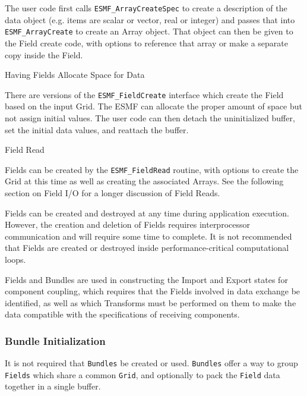\begin{description}
The user code first calls 
{\tt ESMF\_ArrayCreateSpec} to create a
description of the data object (e.g. items are scalar or vector,
real or integer) and passes that into {\tt ESMF\_ArrayCreate}
to create an Array object.  That object can then be given
to the Field create code, with options to reference that array
or make a separate copy inside the Field. 

\item{Having Fields Allocate Space for Data}

There are versions of the {\tt ESMF\_FieldCreate} interface
which create the Field based on the input Grid.  The ESMF
can allocate the proper amount of 
space but not assign initial values.  The user code
can then detach the uninitialized buffer, set the
initial data values, and reattach the buffer.

\item{Field Read}

Fields can be created by the {\tt ESMF\_FieldRead}
routine, with options to create the Grid at this time
as well as creating the associated Arrays.
See the following section on Field I/O for a longer
discussion of Field Reads.

\end{description}

Fields can be created and destroyed
at any time during application execution.  However, the creation
and deletion of Fields requires interprocessor communication
and will require some time to complete.  It is not recommended
that Fields are created or destroyed
inside performance-critical computational loops.

Fields and Bundles are used in constructing 
the Import and Export states for component coupling, 
which requires that the 
Fields involved in data exchange be identified, as well as
which Transforms must be performed on them to make the
data compatible with the specifications of
receiving components.  

\subsubsection{Bundle Initialization}

It is not required that {\tt Bundles} be created or used.
{\tt Bundles} offer a way to group {\tt Fields} which share a
common {\tt Grid}, and optionally to pack the {\tt Field} data
together in a single buffer.


